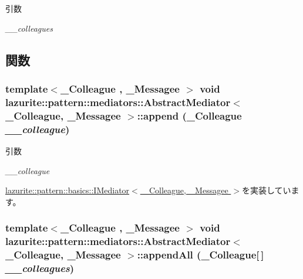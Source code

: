\begin{DoxyParams}{引数}
\item[{\em \_\-\_\-colleagues}]\end{DoxyParams}


\subsection{関数}
\hypertarget{classlazurite_1_1pattern_1_1mediators_1_1_abstract_mediator_3_01___colleague_00_01___messagee_01_4_a75e131257e618fe1179efcb4d6b117fe}{
\subsubsection[{append}]{\setlength{\rightskip}{0pt plus 5cm}template$<$\_\-Colleague , \_\-Messagee $>$ void lazurite::pattern::mediators::AbstractMediator$<$ \_\-Colleague, \_\-Messagee $>$::append (\_\-Colleague {\em \_\-\_\-colleague})}}
\label{classlazurite_1_1pattern_1_1mediators_1_1_abstract_mediator_3_01___colleague_00_01___messagee_01_4_a75e131257e618fe1179efcb4d6b117fe}

\begin{DoxyParams}{引数}
\item[{\em \_\-\_\-colleague}]\end{DoxyParams}


\hyperlink{interfacelazurite_1_1pattern_1_1basics_1_1_i_mediator_3_01___colleague_00_01___messagee_01_4_a9c7651e26bd9e0bb57093a92ef372e66}{lazurite::pattern::basics::IMediator$<$ \_\-Colleague, \_\-Messagee $>$}を実装しています。\hypertarget{classlazurite_1_1pattern_1_1mediators_1_1_abstract_mediator_3_01___colleague_00_01___messagee_01_4_a0064ee99fdcea9cc60a204bcb60ab55b}{
\subsubsection[{appendAll}]{\setlength{\rightskip}{0pt plus 5cm}template$<$\_\-Colleague , \_\-Messagee $>$ void lazurite::pattern::mediators::AbstractMediator$<$ \_\-Colleague, \_\-Messagee $>$::appendAll (\_\-Colleague\mbox{[}$\,$\mbox{]} {\em \_\-\_\-colleagues})}}
\label{classlazurite_1_1pattern_1_1mediators_1_1_abstract_mediator_3_01___colleague_00_01___messagee_01_4_a0064ee99fdcea9cc60a204bcb60ab55b}

